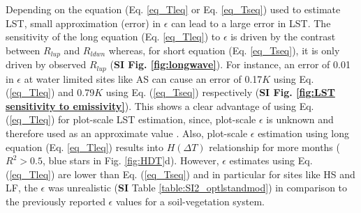 \documentclass[fleqn,10pt]{wlscirep}
\begin{document}
Depending on the equation (Eq. \ref{eq_Tleq} or Eq. \ref{eq_Tseq}) used to estimate LST, small approximation (error) in $\epsilon$ can lead to a large error in LST. The sensitivity of the long equation (Eq. \ref{eq_Tleq}) to $\epsilon$ is driven by the contrast between $R_{lup}$ and $R_{ldwn}$ whereas, for short equation (Eq. \ref{eq_Tseq}), it is only driven by observed $R_{lup}$ (\textbf{SI Fig. \ref{fig:longwave}}). For instance, an error of 0.01 in $\epsilon$ at water limited sites like AS can cause an error of 0.17$K$ using Eq. (\ref{eq_Tleq}) and 0.79$K$ using Eq. (\ref{eq_Tseq}) respectively (\textbf{SI Fig. \ref{fig:LST sensitivity to emissivity}}). This shows a clear advantage of using Eq. (\ref{eq_Tleq}) for plot-scale LST estimation, since, plot-scale $\epsilon$ is unknown and therefore used as an approximate value \cite{mallick2018bridging}. Also, plot-scale $\epsilon$ estimation using long equation (Eq. \ref{eq_Tleq}) results into $H(\Delta T)$ relationship for more months ($R^{2} > 0.5$, blue stars in Fig. \ref{fig:HDT}d). However, $\epsilon$ estimates using Eq. (\ref{eq_Tleq}) are lower than Eq. (\ref{eq_Tseq}) and in particular for sites like HS and LF, the $\epsilon$ was unrealistic (\textbf{SI} Table \ref{table:SI2_optlstandmod}) in comparison to the previously reported  $\epsilon$ values for a soil-vegetation system\cite{sugita_optimal_1996-1,snyder1998classification}. 
\end{document}
